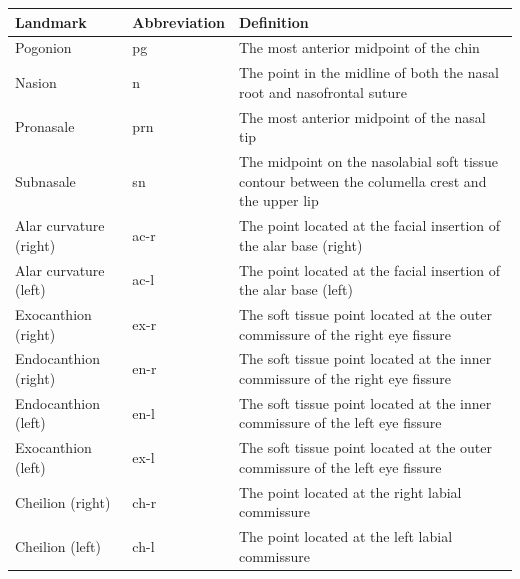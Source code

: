 \documentclass[class=article, crop=false]{standalone}
\begin{document}
\begin{table}[htb]

\label{table:landmark_names}
\begin{tabularx}{\textwidth}{l|l|L}
\toprule
Landmark               & Abbreviation & Definition          
\\
\midrule
Pogonion               & pg           & The most anterior midpoint of the chin                                                                              \\
Nasion                 & n            & The point in the midline of both the nasal root and nasofrontal suture \\
Pronasale              & prn          & The most anterior midpoint of the nasal tip                                                                         \\
Subnasale              & sn           & The midpoint on the nasolabial soft tissue contour between the columella crest and the upper lip                    \\
Alar curvature (right) & ac-r         & The point located at the facial insertion of the alar base (right)                                                  \\
Alar curvature (left)  & ac-l         & The point located at the facial insertion of the alar base (left)                                                   \\
Exocanthion (right)    & ex-r         & The soft tissue point located at the outer commissure of the right eye fissure                                      \\
Endocanthion (right)   & en-r         & The soft tissue point located at the inner commissure of the right eye fissure                                       \\
Endocanthion (left)    & en-l         & The soft tissue point located at the inner commissure of the left eye fissure                                        \\
Exocanthion (left)     & ex-l         & The soft tissue point located at the outer commissure of the left eye fissure                                        \\
Cheilion (right)       & ch-r         & The point located at the right labial commissure                                                                    \\
Cheilion (left)        & ch-l         & The point located at the left labial commissure                                                                     
\end{tabularx}
\end{table}
\end{document}
